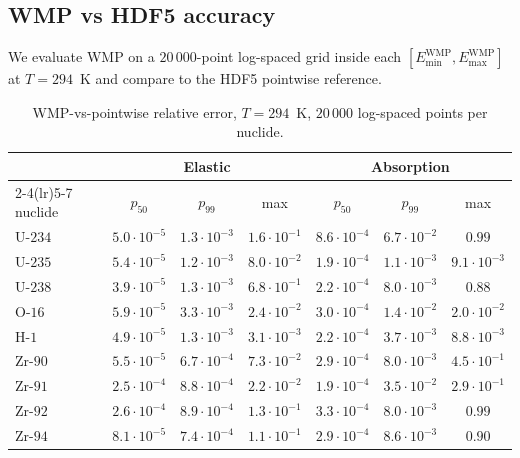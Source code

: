 \documentclass[11pt,a4paper]{article}
\begin{document}
\subsection{WMP vs HDF5 accuracy}
\label{sec:hybrid_acc}

We evaluate WMP on a $20\,000$-point log-spaced grid inside
each $[E_\text{min}^\text{WMP}, E_\text{max}^\text{WMP}]$ at
$T = 294$~K and compare to the HDF5 pointwise reference.

\begin{table}[htb]
\centering
\caption{WMP-vs-pointwise relative error, $T = 294$~K,
$20\,000$ log-spaced points per nuclide.}
\label{tab:hybrid_acc}
\begin{tabular}{@{}lcccccc@{}}
\toprule
 & \multicolumn{3}{c}{Elastic} & \multicolumn{3}{c}{Absorption} \\
\cmidrule(lr){2-4}\cmidrule(lr){5-7}
nuclide & $p_{50}$ & $p_{99}$ & max & $p_{50}$ & $p_{99}$ & max \\
\midrule
U-$234$ & $5.0 \cdot 10^{-5}$ & $1.3 \cdot 10^{-3}$ & $1.6 \cdot 10^{-1}$
        & $8.6 \cdot 10^{-4}$ & $6.7 \cdot 10^{-2}$ & $0.99$ \\
U-$235$ & $5.4 \cdot 10^{-5}$ & $1.2 \cdot 10^{-3}$ & $8.0 \cdot 10^{-2}$
        & $1.9 \cdot 10^{-4}$ & $1.1 \cdot 10^{-3}$ & $9.1 \cdot 10^{-3}$ \\
U-$238$ & $3.9 \cdot 10^{-5}$ & $1.3 \cdot 10^{-3}$ & $6.8 \cdot 10^{-1}$
        & $2.2 \cdot 10^{-4}$ & $8.0 \cdot 10^{-3}$ & $0.88$ \\
O-$16$  & $5.9 \cdot 10^{-5}$ & $3.3 \cdot 10^{-3}$ & $2.4 \cdot 10^{-2}$
        & $3.0 \cdot 10^{-4}$ & $1.4 \cdot 10^{-2}$ & $2.0 \cdot 10^{-2}$ \\
H-$1$   & $4.9 \cdot 10^{-5}$ & $1.3 \cdot 10^{-3}$ & $3.1 \cdot 10^{-3}$
        & $2.2 \cdot 10^{-4}$ & $3.7 \cdot 10^{-3}$ & $8.8 \cdot 10^{-3}$ \\
Zr-$90$ & $5.5 \cdot 10^{-5}$ & $6.7 \cdot 10^{-4}$ & $7.3 \cdot 10^{-2}$
        & $2.9 \cdot 10^{-4}$ & $8.0 \cdot 10^{-3}$ & $4.5 \cdot 10^{-1}$ \\
Zr-$91$ & $2.5 \cdot 10^{-4}$ & $8.8 \cdot 10^{-4}$ & $2.2 \cdot 10^{-2}$
        & $1.9 \cdot 10^{-4}$ & $3.5 \cdot 10^{-2}$ & $2.9 \cdot 10^{-1}$ \\
Zr-$92$ & $2.6 \cdot 10^{-4}$ & $8.9 \cdot 10^{-4}$ & $1.3 \cdot 10^{-1}$
        & $3.3 \cdot 10^{-4}$ & $8.0 \cdot 10^{-3}$ & $0.99$ \\
Zr-$94$ & $8.1 \cdot 10^{-5}$ & $7.4 \cdot 10^{-4}$ & $1.1 \cdot 10^{-1}$
        & $2.9 \cdot 10^{-4}$ & $8.6 \cdot 10^{-3}$ & $0.90$ \\
\bottomrule
\end{tabular}
\end{table}
\end{document}
